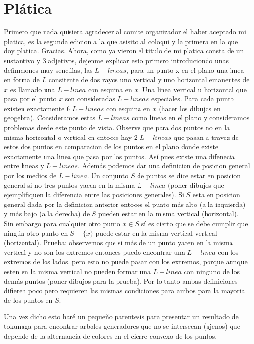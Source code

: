 \documentclass[11pt,a4paper]{article}
\begin{document}
\section{Plática}
Primero que nada quisiera agradecer al comite organizador el haber aceptado mi platica, es la segunda edicion a la que asisito al coloqui y la primera en la que doy platica. Gracias.
Ahora, como ya vieron el titulo de mi platica consta de un sustantivo y 3 adjetivos, dejenme explicar esto primero introduciondo unas definiciones muy sencillas, las $L-lineas$, para un punto x en el plano una linea en forma de $L$ consitente de dos rayos uno vertical y uno horizontal emanentes de $x$ es llamado una $L-linea$ con esquina en $x$. Una linea vertical u horizontal que pasa por el punto $x$ son consideradas $L-lineas$ especiales. Para cada punto existen exactamente 6 $L-lineas$ con esquina en $x$ (hacer los dibujos en geogebra). Consideramos estas $L-lineas$ como lineas en el plano y consideramos problemas desde este punto de vista. Observe que para dos puntos no en la misma horizontal o vertical en entoces hay 2 $L-lineas$ que pasan a travez de estos dos puntos en comparacion de los puntos en el plano donde existe exactamente una linea que pasa por los puntos. Así pues existe una difenecia entre lineas y $L-lineas$.  Además podemos dar una definicion de posicion general por los medios de $L-linea$. Un conjunto $S$ de puntos se dice estar en posicion general si no tres puntos yacen en la misma $L-linea$ (poner dibujos que ejemplifiquen la diferencia entre las posiciones generales). Si $S$ esta en posicion general dada por la definicion anterior entoces el punto más alto (a la izquierda) y más bajo (a la derecha) de $S$ pueden estar en la misma vertical (horizontal). Sin embargo para cualquier otro punto $x \in S$ sí es cierto que se debe cumplir que ningún otro punto  en $S-\lbrace x \rbrace$ puede estar en la misma vertical vertical (horizontal). Prueba: observemos que si más de un punto yacen en la misma vertical y no son los extremos entonces puedo encontrar una $L-linea$ con los extremos de los lados, pero esto no puede pasar con los extremos, porque aunque esten en la misma vertical no pueden formar una $L-linea$ con ninguno de los demás puntos (poner dibujos para la prueba). Por lo tanto ambas definiciones difieren poco pero requieren las mismas condiciones para ambos para la mayoria de los puntos en $S$. 

Una vez dicho esto haré un pequeño parentesis para presentar un resultado de tokunaga para encontrar arboles generadores que no se intersecan (ajenos) que depende de la alternancia de colores en el cierre convexo de los puntos. 
\end{document}
